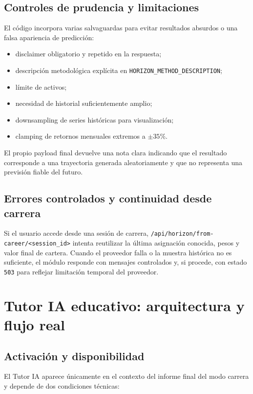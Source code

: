 \subsection{Controles de prudencia y limitaciones}

El código incorpora varias salvaguardas para evitar resultados absurdos o una falsa apariencia de predicción:

\begin{itemize}
    \item disclaimer obligatorio y repetido en la respuesta;
    \item descripción metodológica explícita en \texttt{HORIZON\_METHOD\_DESCRIPTION};
    \item límite de activos;
    \item necesidad de historial suficientemente amplio;
    \item downsampling de series históricas para visualización;
    \item clamping de retornos mensuales extremos a \(\pm 35\%\).
\end{itemize}

El propio payload final devuelve una nota clara indicando que el resultado corresponde a una trayectoria generada aleatoriamente y que no representa una previsión fiable del futuro.

\subsection{Errores controlados y continuidad desde carrera}

Si el usuario accede desde una sesión de carrera, \texttt{/api/horizon/from-career/<session\_id>} intenta reutilizar la última asignación conocida, pesos y valor final de cartera. Cuando el proveedor falla o la muestra histórica no es suficiente, el módulo responde con mensajes controlados y, si procede, con estado \texttt{503} para reflejar limitación temporal del proveedor.

\section{Tutor IA educativo: arquitectura y flujo real}

\subsection{Activación y disponibilidad}

El Tutor IA aparece únicamente en el contexto del informe final del modo carrera y depende de dos condiciones técnicas:

